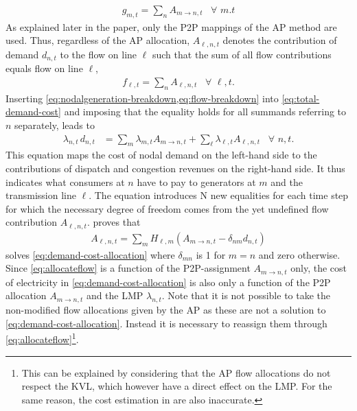\documentclass[11pt,twocolumn]{article}
\newcommand{\Forall}[1]{\hspace{10pt} \forall \,\, #1 }
\newcommand{\nodalgeneration}[1][n]{g_{#1,t}}
\newcommand{\flow}{f_{\ell,t}}
\newcommand{\lmp}[1][n]{\lambda_{#1,t}}
\newcommand{\demand}[1][n]{d_{#1,t}}
\newcommand{\ptdf}[1][n]{H_{\ell,#1}}
\newcommand{\allocatepeer}[1][m \rightarrow n]{A_{#1,t}}
\newcommand{\allocateflow}[1][n]{A_{\ell,#1,t}}
\begin{document}
\begin{align}
    \nodalgeneration[m] = \sum_n \allocatepeer \Forall{m.t} 
    \label{eq:nodalgeneration-breakdown}
\end{align}   
As explained later in the paper, only the \ac{P2P} mappings of the \ac{AP} method are used. Thus, regardless of the \ac{AP} allocation, $\allocateflow$ denotes the contribution of demand $\demand$ to the flow on line $\ell$ such that the sum of all flow contributions equals flow on line $\ell$,  
\begin{align}
    \flow = \sum_n \allocateflow \Forall{\ell,t}.
    \label{eq:flow-breakdown}
\end{align}
Inserting \cref{eq:nodalgeneration-breakdown,eq:flow-breakdown} into \cref{eq:total-demand-cost} and imposing that the equality holds for all summands referring to $n$ separately, leads to 
\begin{align}
    \lmp\, \demand &= \sum_m \lmp[m] \allocatepeer + \sum_\ell \lmp[\ell] \allocateflow \Forall{n,t}.
    \label{eq:demand-cost-allocation}
\end{align}
This equation maps the cost of nodal demand on the left-hand side to the contributions of dispatch and congestion revenues on the right-hand side. It thus indicates what consumers at $n$ have to pay to generators at $m$ and the transmission line $\ell$. The equation introduces N new equalities for each time step for which the necessary degree of freedom comes from the yet undefined flow contribution $\allocateflow$.  proves that 
\begin{align}
    \allocateflow = \sum_m \ptdf[m] (\allocatepeer - \delta_{nm} \demand) 
    \label{eq:allocateflow}
\end{align}
solves \cref{eq:demand-cost-allocation} where $\delta_{mn}$ is 1 for $m=n$ and zero otherwise. Since \cref{eq:allocateflow} is a function of the \ac{P2P}-assignment $\allocatepeer$ only, the cost of electricity in \cref{eq:demand-cost-allocation} is also only a function of the \ac{P2P} allocation $\allocatepeer$ and the \ac{LMP} $\lmp$. 
Note that it is not possible to take the non-modified flow allocations given by the \ac{AP} as these are not a solution to \cref{eq:demand-cost-allocation}. Instead it is necessary to reassign them through \cref{eq:allocateflow}\footnote{This can be explained by considering that the \ac{AP} flow allocations do not respect the \ac{KVL}, which however have a direct effect on the \ac{LMP}. For the same reason, the cost estimation in \cite{meng_investigation_2007} are also inaccurate.}. 
\end{document}
